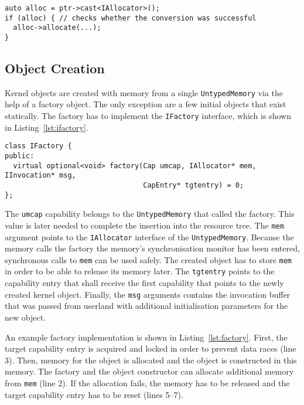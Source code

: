 \begin{lstlisting}[float, label=lst:cast, caption=Casting a kernel object into a more specific type.]
auto alloc = ptr->cast<IAllocator>();
if (alloc) { // checks whether the conversion was successful
  alloc->allocate(...);
}
\end{lstlisting}



\subsection{Object Creation}

Kernel objects are created with memory from a single
\texttt{UntypedMemory} via the help of a factory object.  The only
exception are a few initial objects that exist statically.  The
factory has to implement the \texttt{IFactory} interface, which is
shown in Listing~\ref{lst:ifactory}.

\begin{lstlisting}[float, label=lst:ifactory, caption=The \texttt{IFactory} interface.]
class IFactory {
public:
  virtual optional<void> factory(Cap umcap, IAllocator* mem, IInvocation* msg,
                                 CapEntry* tgtentry) = 0;
};
\end{lstlisting}

The \texttt{umcap} capability belongs to the \texttt{UntypedMemory}
that called the factory.  This value is later needed to complete the
insertion into the resource tree.  The \texttt{mem} argument points to
the \texttt{IAllocator} interface of the \texttt{UntypedMemory}.
Because the memory calls the factory the memory's synchronisation
monitor has been entered, synchronous calls to \texttt{mem} can be
used safely.  The created object has to store \texttt{mem} in order to
be able to release its memory later.  The \texttt{tgtentry} points to
the capability entry that shall receive the first capability that
points to the newly created kernel object.  Finally, the \texttt{msg}
arguments contains the invocation buffer that was passed from userland
with additional initialisation parameters for the new object.

An example factory implementation is shown in
Listing~\ref{lst:factory}.  First, the target capability entry is
acquired and locked in order to prevent data races (line 3).  Then,
memory for the object is allocated and the object is constructed in
this memory.  The factory and the object constructor can allocate
additional memory from \texttt{mem} (line 2).  If the allocation
fails, the memory has to be released and the target capability entry
has to be reset (lines 5--7).

